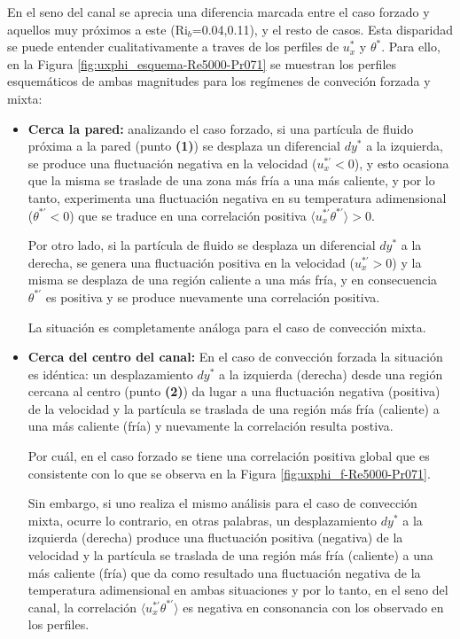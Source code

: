 En el seno del canal se aprecia una diferencia marcada entre el caso forzado y aquellos muy próximos a este (Ri$_b$=0.04,0.11), y el resto de casos. Esta disparidad se puede entender cualitativamente a traves de los perfiles de $u^*_x$ y $\theta^*$. Para ello, en la Figura \ref{fig:uxphi_esquema-Re5000-Pr071} se muestran los perfiles esquemáticos de ambas magnitudes para los regímenes de conveción forzada y mixta:

\begin{itemize}

\item \textbf{Cerca la pared:} analizando el caso forzado, si una partícula de fluido próxima a la pared (punto \textbf{(1)}) se desplaza un diferencial $dy^*$ a la izquierda, se produce una fluctuación negativa en la velocidad ($u^{* \prime}_x <0$), y esto ocasiona que la misma se traslade de una zona más fría a una más caliente, y por lo tanto, experimenta una fluctuación negativa en su temperatura adimensional ($\theta^{* \prime}<0$) que se traduce en una correlación positiva $\langle u_x^{\ast \prime } \theta^{\ast \prime } \rangle > 0$. 

Por otro lado, si la partícula de fluido se desplaza un diferencial $dy^*$ a la derecha, se genera una fluctuación positiva en la velocidad ($u^{* \prime}_x >0$) y la misma se desplaza de una región caliente a una más fría, y en consecuencia $\theta^{* \prime}$ es positiva y se produce nuevamente una correlación positiva.

La situación es completamente análoga para el caso de convección mixta.

\item \textbf{Cerca del centro del canal:} En el caso de convección forzada la situación es idéntica: un desplazamiento $dy^*$ a la izquierda (derecha) desde una región cercana al centro (punto \textbf{(2)}) da lugar a una fluctuación negativa (positiva) de la velocidad y la partícula se traslada de una región más fría (caliente) a una más caliente (fría) y nuevamente la correlación resulta postiva. 

Por cuál, en el caso forzado se tiene una correlación positiva global que es consistente con lo que se observa en la Figura \ref{fig:uxphi_f-Re5000-Pr071}. 

Sin embargo, si uno realiza el mismo análisis para el caso de convección mixta, ocurre lo contrario, en otras palabras, un desplazamiento $dy^*$ a la izquierda (derecha) produce una fluctuación positiva (negativa) de la velocidad y la partícula se traslada de una región más fría (caliente) a una más caliente (fría) que da como resultado una fluctuación negativa de la temperatura adimensional en ambas situaciones y por lo tanto, en el seno del canal, la correlación $\langle u_x^{\ast \prime } \theta^{\ast \prime } \rangle$ es negativa en consonancia con los observado en los perfiles.
\end{itemize}  


